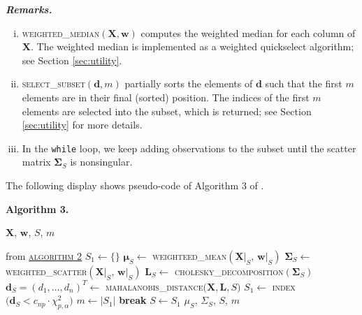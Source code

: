 \documentclass[a4paper,oneside,11pt,DIV=12]{scrartcl}
\newcommand{\code}[1]{{\texttt{#1}}}
\begin{document}
\vspace{1em}
\noindent\textbf{\sffamily \small \itshape Remarks.}
\vspace{-0.5em}
\begin{enumerate}[i)]
	\item \textsc{weighted\_median}$(\bm X, \bm w)$ computes the weighted median for each column of $\bm X$. The weighted median is implemented as a weighted quickselect algorithm; see Section \ref{sec:utility}. 
	\item \textsc{select\_subset}$(\bm d, m)$ partially sorts the elements of $\bm d$ such that the first $m$ elements are in their final (sorted) position. The indices of the first $m$ elements are selected into the subset, which is returned; see Section \ref{sec:utility} for more details.
	\item In the \code{while} loop, we keep adding observations to the subset until the scatter matrix $\bm \Sigma_S$ is nonsingular.
\end{enumerate}

\vspace{1em}
\noindent The following display shows pseudo-code of Algorithm 3 of \citet{billor_hadi_etal_2000}.

\vspace{1em}
\noindent \textbf{\sffamily Algorithm 3.}  
\begin{algorithmic}[1]
	\hypertarget{alg:alg3}{\Require $\bm X$, $\bm w$, $S$, $m$} from \hyperlink{alg:alg2}{\textsc{algorithm} 2}
	\State $S_1 \gets \{\}$
		\State $\bm \mu_S \gets$ \textsc{weighteed\_mean}$(\bm X\vert_S,\, \bm w\vert_S)$
		\State $\bm \Sigma_S \gets$ \textsc{weighted\_scatter}$(\bm X\vert_S, \, \bm w\vert_S)$
		\State $\bm L_S \gets$ \textsc{cholesky\_decomposition}$(\bm \Sigma_S)$
		\State $\bm d_S = (d_1, \ldots, d_n)^T  \gets$ \textsc{mahalanobis\_distance}$\big(\bm X, \bm L, S \big)$
		\State $S_1 \gets$ \textsc{index}$\big( \bm d_S < c_{np}\cdot \chi_{p,\alpha}^2\big)$
		\State $m \gets \vert S_1\vert$
			\State \textbf{break}
		\EndIf
		\State $S \gets S_1$
	\EndWhile
	\State \Return $\mu_S$, $\Sigma_S$, $S$, $m$
\end{algorithmic}
\end{document}
